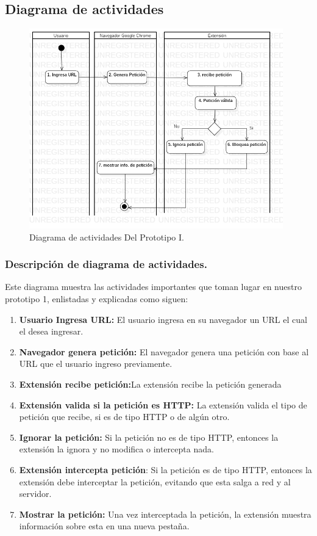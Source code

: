 \documentclass[12pt, a4paper, titlepage]{report}
\begin{document}
			\subsection{Diagrama de actividades}
			    \begin{figure}[H]
				    \begin{center} \includegraphics[width=11cm]{./imagenes/Desarrollo/Prototipo_1/DA_P1.png}
				        \caption{Diagrama de actividades Del Prototipo I.}
			        \end{center}
			    \end{figure}
			    
			\subsubsection{Descripción de diagrama de actividades.}
			Este diagrama muestra las actividades importantes que toman lugar en nuestro prototipo 1, enlistadas y explicadas como siguen: 
			
			\begin{enumerate}
			    \item \textbf{Usuario Ingresa URL:} El usuario ingresa en su navegador un URL el cual el desea ingresar.
			    \item \textbf{Navegador genera petición:} El navegador genera una petición con base al URL que el usuario ingreso previamente.
			    \item \textbf{Extensión recibe petición:}La extensión recibe la petición generada
			    \item \textbf{Extensión valida si la petición es HTTP:} La extensión valida el tipo de petición que recibe, si es de tipo HTTP o de algún otro.
			    \item \textbf{Ignorar la petición:} Si la petición no es de tipo HTTP, entonces la extensión la ignora y no modifica o intercepta nada.
			    \item \textbf{Extensión intercepta petición}: Si la petición es de tipo HTTP, entonces la extensión debe interceptar la petición, evitando que esta salga a red y al servidor.
			    \item \textbf{Mostrar la petición:} Una vez interceptada la petición, la extensión muestra información sobre esta en una nueva pestaña.
			\end{enumerate}
			
\end{document}
